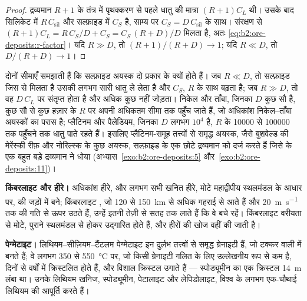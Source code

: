 \begin{proof}
द्रव्यमान $R + 1$ के तंत्र में पृथक्करण से पहले धातु की मात्रा $(R + 1)C_L$ थी। उसके बाद सिलिकेट में
$R\,C_{\mathrm{sil}}$ और सल्फ़ाइड में $C_S$ है, साम्य पर $C_S = D\,C_{\mathrm{sil}}$ के साथ।
संरक्षण से $(R + 1)C_L = R\,C_S/D + C_S = C_S\,(R + D)/D$ मिलता है, अतः
\eqref{eq:b2:ore-deposits:r-factor}। यदि $R \gg D$, तो $(R + 1)/(R + D) \to 1$; यदि $R \ll D$, तो
$D/(R + D) \to 1$।
\end{proof}

दोनों सीमाएँ समझाती हैं कि सल्फ़ाइड अयस्क दो प्रकार के क्यों होते हैं। जब $R \ll D$, तो सल्फ़ाइड जिस  से
मिलता है उसकी लगभग सारी धातु ले लेता है और $C_S$, $R$ के साथ बढ़ता है; जब $R \gg D$, तो वह $D\,C_L$ पर
संतृप्त होता है और अधिक  कुछ नहीं जोड़ता। निकेल और ताँबा, जिनका $D$ कुछ सौ है, कुछ सौ से कुछ हज़ार के
$R$ पर अपनी अधिकतम सीमा तक पहुँच जाते हैं, जो अधिकांश निकेल--ताँबा अयस्कों का परास है; प्लैटिनम और पैलेडियम,
जिनका $D$ लगभग $10^4$ है, $R$ के \num{10000} से \num{100000} तक पहुँचने तक धातु पाते रहते हैं। इसलिए
प्लैटिनम-समूह तत्त्वों से समृद्ध अयस्क, जैसे बुशवेल्ड की मेरेंस्की रीफ़ और नोरिल्स्क के कुछ अयस्क, सल्फ़ाइड के
एक छोटे द्रव्यमान को दर्ज करते हैं जिसे  के एक बहुत बड़े द्रव्यमान ने धोया
(अभ्यास~\ref{exo:b2:ore-deposits:5} और~\ref{exo:b2:ore-deposits:11})।

\textbf{किंबरलाइट और हीरे।} अधिकांश हीरे, और लगभग सभी खनित हीरे, मोटे महाद्वीपीय स्थलमंडल के आधार पर,
 की जड़ों में बने; किंबरलाइट , जो 120 से \qty{150}{km} से अधिक गहराई से आते हैं और
\qty{20}{m.s^{-1}} तक की गति से ऊपर उठते हैं, उन्हें इतनी तेज़ी से सतह तक लाते हैं कि वे बचे रहें।
किंबरलाइट वरीयता से मोटे, पुराने स्थलमंडल से होकर उद्गारित होते हैं, और हीरों की खोज
वहीं की जाती है।

\textbf{पेग्मेटाइट।} लिथियम--सीज़ियम--टैंटलम पेग्मेटाइट इन दुर्लभ तत्त्वों से समृद्ध ग्रेनाइटी  हैं, जो
टक्कर वाली  में बनते हैं; वे लगभग 350 से \qty{550}{\celsius} पर, जो किसी ग्रेनाइटी गलित के
लिए उल्लेखनीय रूप से कम है, दिनों से वर्षों में क्रिस्टलित होते हैं, और विशाल क्रिस्टल उगाते हैं --- स्पोड्यूमीन
का एक क्रिस्टल \qty{14}{m} लंबा था। उनके लिथियम खनिज, स्पोड्यूमीन, पेटालाइट और लेपिडोलाइट, विश्व के
लगभग एक-चौथाई लिथियम की आपूर्ति करते हैं।

